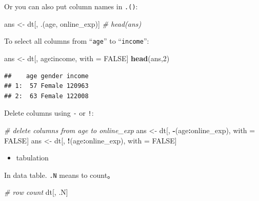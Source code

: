 \documentclass[12pt,]{krantz}
\newenvironment{Shaded}{\begin{snugshade}}{\end{snugshade}}
\newcommand{\KeywordTok}[1]{\textcolor[rgb]{0.13,0.29,0.53}{\textbf{#1}}}
\newcommand{\DecValTok}[1]{\textcolor[rgb]{0.00,0.00,0.81}{#1}}
\newcommand{\StringTok}[1]{\textcolor[rgb]{0.31,0.60,0.02}{#1}}
\newcommand{\CommentTok}[1]{\textcolor[rgb]{0.56,0.35,0.01}{\textit{#1}}}
\newcommand{\OtherTok}[1]{\textcolor[rgb]{0.56,0.35,0.01}{#1}}
\newcommand{\OperatorTok}[1]{\textcolor[rgb]{0.81,0.36,0.00}{\textbf{#1}}}
\newcommand{\NormalTok}[1]{#1}
\providecommand{\tightlist}{%
  \setlength{\itemsep}{0pt}\setlength{\parskip}{0pt}}
\theoremstyle{definition}
\theoremstyle{definition}
\theoremstyle{definition}
\theoremstyle{remark}
\begin{document}
Or you can also put column names in \texttt{.()}:

\begin{Shaded}
\begin{Highlighting}[]
\NormalTok{ans <-}\StringTok{ }\NormalTok{dt[, .(age, online_exp)]}
\CommentTok{# head(ans)}
\end{Highlighting}
\end{Shaded}

To select all columns from ``\texttt{age}'' to ``\texttt{income}'':

\begin{Shaded}
\begin{Highlighting}[]
\NormalTok{ans <-}\StringTok{ }\NormalTok{dt[, age}\OperatorTok{:}\NormalTok{income, with =}\StringTok{ }\OtherTok{FALSE}\NormalTok{]}
\KeywordTok{head}\NormalTok{(ans,}\DecValTok{2}\NormalTok{)}
\end{Highlighting}
\end{Shaded}

\begin{verbatim}
##    age gender income
## 1:  57 Female 120963
## 2:  63 Female 122008
\end{verbatim}

Delete columns using \texttt{-} or \texttt{!}:

\begin{Shaded}
\begin{Highlighting}[]
\CommentTok{# delete columns from  age to online_exp}
\NormalTok{ans <-}\StringTok{ }\NormalTok{dt[, }\OperatorTok{-}\NormalTok{(age}\OperatorTok{:}\NormalTok{online_exp), with =}\StringTok{ }\OtherTok{FALSE}\NormalTok{]}
\NormalTok{ans <-}\StringTok{ }\NormalTok{dt[, }\OperatorTok{!}\NormalTok{(age}\OperatorTok{:}\NormalTok{online_exp), with =}\StringTok{ }\OtherTok{FALSE}\NormalTok{]}
\end{Highlighting}
\end{Shaded}

\begin{itemize}
\tightlist
\item
  tabulation
\end{itemize}

In data table. \texttt{.N} means to count。

\begin{Shaded}
\begin{Highlighting}[]
\CommentTok{# row count}
\NormalTok{dt[, .N] }
\end{Highlighting}
\end{Shaded}
\end{document}
